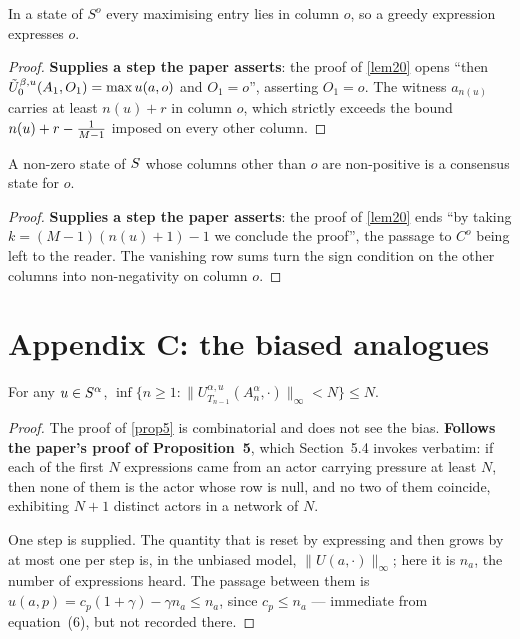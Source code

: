 \begin{lemma}
  \label{lem20-opening}
  \leanok
  In a state of $S^o$ every maximising entry lies in column $o$, so a greedy
  expression expresses $o$.
\end{lemma}
\begin{proof}
  \leanok
  \textbf{Supplies a step the paper asserts}: the proof of \ref{lem20} opens
  ``then $\tilde{U}^{\beta,u}_0(A_1,O_1) = \max u(a,o)$ and $O_1 = o$'', asserting $O_1 =
  o$.  The witness $a_{n(u)}$ carries at least $n(u) + r$ in column $o$, which
  strictly exceeds the bound $n(u) + r - \tfrac{1}{M-1}$ imposed on every other
  column.
\end{proof}

\begin{lemma}
  \label{lem20-closing}
  \leanok
  A non-zero state of $S$ whose columns other than $o$ are non-positive is
  a consensus state for $o$.
\end{lemma}
\begin{proof}
  \leanok
  \textbf{Supplies a step the paper asserts}: the proof of \ref{lem20} ends
  ``by taking $k = (M-1)(n(u)+1)-1$ we conclude the proof'', the passage to
  $C^o$ being left to the reader.  The vanishing row sums turn the sign
  condition on the other columns into non-negativity on column $o$.
\end{proof}

\chapter{Appendix C: the biased analogues}

\begin{proposition}
  \label{prop21}
  \leanok
  For any $u \in S^\alpha$,
  $\inf\{ n \ge 1 : \|U^{\alpha,u}_{T_{n-1}}(A_n^\alpha, \cdot)\|_\infty < N \} \le N$.
\end{proposition}
\begin{proof}
  \leanok
  The proof of \ref{prop5} is combinatorial and does not see the bias.
  \textbf{Follows the paper's proof of Proposition~5}, which Section~5.4
  invokes verbatim: if each of the first $N$ expressions came from an actor
  carrying pressure at least $N$, then none of them is the actor whose row is
  null, and no two of them coincide, exhibiting $N+1$ distinct actors in a
  network of $N$.

  One step is supplied.  The quantity that is reset by expressing and then grows
  by at most one per step is, in the unbiased model,
  $\|U(a, \cdot)\|_\infty$; here it is $n_a$, the number of expressions heard.
  The passage between them is $u(a,p) = c_p(1+\gamma) - \gamma n_a \le n_a$,
  since $c_p \le n_a$ --- immediate from equation~(6), but not recorded there.
\end{proof}

